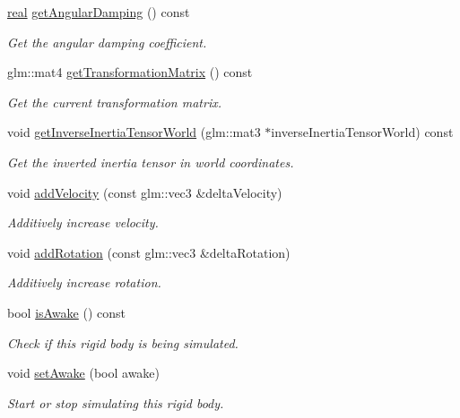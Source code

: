 \begin{DoxyCompactItemize}
\mbox{\hyperlink{namespacer3_ab2016b3e3f743fb735afce242f0dc1eb}{real}} \mbox{\hyperlink{classr3_1_1_rigid_body_afcef73f6bf5ad38780f39c8ebb5c4af1}{get\+Angular\+Damping}} () const
\begin{DoxyCompactList}\small\item\em Get the angular damping coefficient. \end{DoxyCompactList}\item 
glm\+::mat4 \mbox{\hyperlink{classr3_1_1_rigid_body_a64a7edc9c2771caeceb54033d8953e2c}{get\+Transformation\+Matrix}} () const
\begin{DoxyCompactList}\small\item\em Get the current transformation matrix. \end{DoxyCompactList}\item 
void \mbox{\hyperlink{classr3_1_1_rigid_body_ae9057a0acbb7dd552a23557ed773b3d5}{get\+Inverse\+Inertia\+Tensor\+World}} (glm\+::mat3 $\ast$inverse\+Inertia\+Tensor\+World) const
\begin{DoxyCompactList}\small\item\em Get the inverted inertia tensor in world coordinates. \end{DoxyCompactList}\item 
void \mbox{\hyperlink{classr3_1_1_rigid_body_aa3303f1eb97e56d75562525b5e317937}{add\+Velocity}} (const glm\+::vec3 \&delta\+Velocity)
\begin{DoxyCompactList}\small\item\em Additively increase velocity. \end{DoxyCompactList}\item 
void \mbox{\hyperlink{classr3_1_1_rigid_body_aaa3f92c7abc8b733a3dac8841ff41b61}{add\+Rotation}} (const glm\+::vec3 \&delta\+Rotation)
\begin{DoxyCompactList}\small\item\em Additively increase rotation. \end{DoxyCompactList}\item 
bool \mbox{\hyperlink{classr3_1_1_rigid_body_a162bb9f31e5214001dabb1bdd94a9fbf}{is\+Awake}} () const
\begin{DoxyCompactList}\small\item\em Check if this rigid body is being simulated. \end{DoxyCompactList}\item 
void \mbox{\hyperlink{classr3_1_1_rigid_body_acd934e55a7f2f09d91f62ded40ebb325}{set\+Awake}} (bool awake)
\begin{DoxyCompactList}\small\item\em Start or stop simulating this rigid body. \end{DoxyCompactList}\item 

\end{DoxyCompactItemize}
